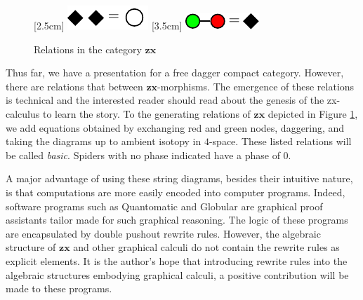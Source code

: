 \documentclass[]{amsart}
\theoremstyle{defn}
\begin{document}
\begin{figure}
{\begin{minipage}{\textwidth}
			\vspace{1em} 
			\linebreak
			[2.5cm]{%
				\centering
				\includegraphics{equation_loop}
			}
			[3.5cm]{%
				\centering
				\includegraphics{equation_diamond}
			}
		\end{minipage}
	}
	\caption{Relations in the category $\mathbf{zx}$}
	\label{fig:ZX equations}
\end{figure}

Thus far, we have a presentation for a free dagger compact category. However, there are relations that between $\mathbf{zx}$-morphisms.  The emergence of these relations is technical and the interested reader should read about the genesis of the zx-calculus \cite{CoeckeDuncan_QuantumObsFullPaper} to learn the story. To the generating relations of $\mathbf{zx}$ depicted in Figure \ref{fig:ZX equations}, we add equations obtained by exchanging red and green nodes, daggering, and taking the diagrams up to ambient isotopy in $4$-space. These listed relations will be called \emph{basic}.  Spiders with no phase indicated have a phase of $0$. 

A major advantage of using these string diagrams, besides their intuitive nature, is that computations are more easily encoded into computer programs.  Indeed, software programs such as Quantomatic \cite{BarKissingerVicary_Globular,DixonDuncanKissinger_QuantomaticWebsite} and Globular \cite{BarKissingerVicary_Globular} are graphical proof assistants tailor made for such graphical reasoning.  The logic of these programs are encapsulated by double pushout rewrite rules.  However, the algebraic structure of $\mathbf{zx}$ and other graphical calculi do not contain the rewrite rules as explicit elements.  It is the author's hope that introducing rewrite rules into the algebraic structures embodying graphical calculi, a positive contribution will be made to these programs.  
\end{document}
